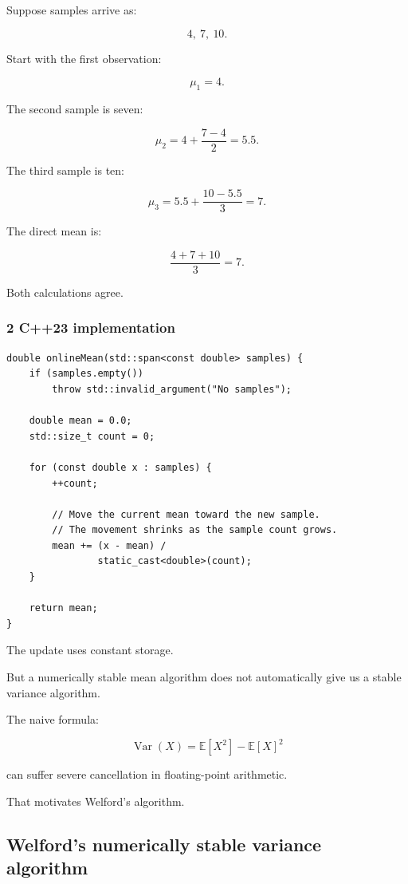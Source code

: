 \hypertarget{02-foundations-ii-ch030-worked-trace}{}

Suppose samples arrive as:

\[
 4,\ 7,\ 10.
\]

Start with the first observation:

\[
 \mu_1=4.
\]

The second sample is seven:

\[
 \mu_2 = 4+\frac{7-4}{2} =5.5.
\]

The third sample is ten:

\[
 \mu_3 = 5.5+\frac{10-5.5}{3} =7.
\]

The direct mean is:

\[
 \frac{4+7+10}{3}=7.
\]

Both calculations agree.

\subsubsection{2 C++23 implementation}\label{02-foundations-ii-ch030-c23-implementation}

\hypertarget{02-foundations-ii-ch030-c23-implementation}{}

\begin{verbatim}
double onlineMean(std::span<const double> samples) {
    if (samples.empty())
        throw std::invalid_argument("No samples");

    double mean = 0.0;
    std::size_t count = 0;

    for (const double x : samples) {
        ++count;

        // Move the current mean toward the new sample.
        // The movement shrinks as the sample count grows.
        mean += (x - mean) /
                static_cast<double>(count);
    }

    return mean;
}
\end{verbatim}

The update uses constant storage.

But a numerically stable mean algorithm does not automatically give us a stable variance algorithm.

The naive formula:

\[
 \operatorname{Var}(X)= \mathbb E[X^2]-\mathbb E[X]^2
\]

can suffer severe cancellation in floating-point arithmetic.

That motivates Welford's algorithm.

\subsection{Welford's numerically stable variance algorithm}\label{02-foundations-ii-ch030-welfords-numerically-stable-variance-algorithm}


